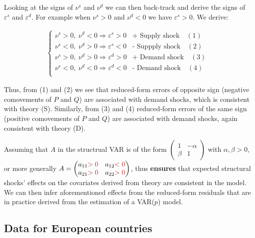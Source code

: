 \noindent Looking at the signs of $\nu^{s}$ and $\nu^{d}$ we can then back-track and derive the signs of $\varepsilon^{s}$ and $\varepsilon^{d}$. 
For example when $\nu^{s}>0$ and $\nu^{d}<0$ we have $\varepsilon^{s}>0$. We derive:

\begin{align*}
    \begin{cases}
        \nu^{s}>0,\; \nu^{d}<0 \Rightarrow \varepsilon^{s}>0 & \textrm{+ Supply shock} \quad (1)\\
        \nu^{s}<0,\; \nu^{d}>0 \Rightarrow \varepsilon^{s}<0 & \textrm{- Suppply shock} \quad (2) \\
        \nu^{s}>0,\; \nu^{d}>0 \Rightarrow \varepsilon^{d}>0 & \textrm{+ Demand shock}  \quad (3) \\
        \nu^{s}<0,\; \nu^{d}<0 \Rightarrow \varepsilon^{d}<0 & \textrm{- Demand shock}  \quad (4) \\
    \end{cases}  
\end{align*}

\noindent Thus, from (1) and (2) we see that reduced-form errors of opposite sign (negative comovements of $P$ and $Q$) are associated with demand shocks, which is consistent with theory (S).
Similarly, from (3) and (4) reduced-form errors of the same sign (positive comovements of $P$ and $Q$) are associated with demand shocks, again consistent with theory (D).

\noindent Assuming that $A$ in the structrual VAR is of the form $\begin{pmatrix} 1 & - \alpha \\ \beta & 1 \end{pmatrix}$ with $\alpha,\beta>0$, or more generally $A =\begin{pmatrix} a_{11}\red{>0} & a_{12}\red{<0} \\ a_{21}\red{>0} & a_{22}\red{>0} \end{pmatrix}$, thus \textbf{ensures} that expected structural shocks' effects on the covariates derived from theory are consistent in the model. 
We can then infer aforementioned effects from the reduced-form residuals that are in practice derived from the estimation of a VAR($p$) model.

\subsection{Data for European countries}

